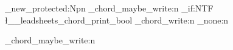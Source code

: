\ExplSyntaxOn
\cs_new_protected:Npn \leadsheets_chord_maybe_write:n
{
  \bool_if:NTF \l__leadsheets_chord_print_bool
  {
    \leadsheets_chord_write:n
  }
  {
    \use_none:n
  } 
}

\RenewDocumentCommand \writechord {}
{\leadsheets_chord_maybe_write:n }
\ExplSyntaxOff


